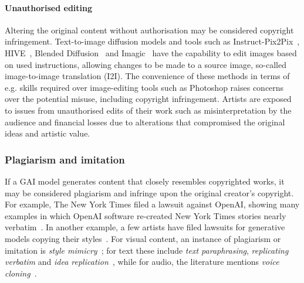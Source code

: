\documentclass[conference,table]{IEEEtran} %
\begin{document}
        \paragraph{Unauthorised editing} Altering the original content without authorisation may be considered copyright infringement. 
        Text-to-image diffusion models and tools such as Instruct-Pix2Pix~\cite{brooks_instructpix2pix_2023}, HIVE~\cite{zhang_hive_2023}, Blended Diffusion~\cite{avrahami_blended_2022} and Imagic~\cite{kawar_imagic_2023} have the capability to edit images based on used instructions, allowing changes to be made to a source image, so-called image-to-image translation (I2I). 
        The convenience of these methods in terms of e.g. skills required over image-editing tools such as Photoshop raises concerns over the potential misuse, including copyright infringement. 
        Artists are exposed to issues from unauthorised edits of their work such as misinterpretation by the audience and financial losses due to alterations that compromised the original ideas and artistic value. 

\subsubsection{Plagiarism and imitation} 
If a GAI model generates content that closely resembles copyrighted works, it may be considered plagiarism and infringe upon the original creator's copyright. 
For example, The New York Times filed a lawsuit against OpenAI, showing many examples in which OpenAI software re-created New York Times stories nearly verbatim~\cite{grynbaum_new_2023}. 
In another example, a few artists have filed lawsuits for generative models copying their styles~\cite{brittain_judge_2023}.
For visual content, an instance of plagiarism or imitation is \textit{style mimicry}~\cite{gal_image_2022}; for text these include \textit{text paraphrasing}, \textit{replicating verbatim} and \textit{idea replication}~\cite{lee_language_2023}, while for audio, the literature mentions \textit{voice cloning}~\cite{qian_autovc_2019}.
\end{document}
